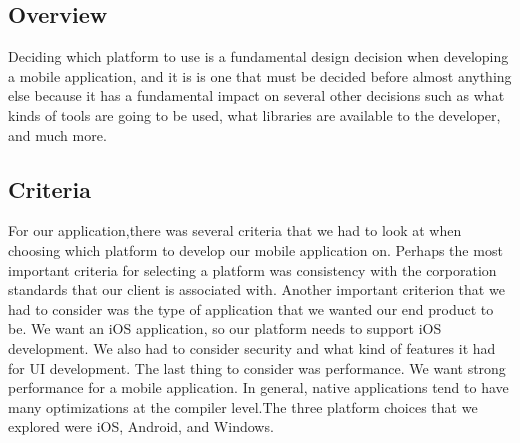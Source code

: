 \documentclass[onecolumn, draftclsnofoot,10pt, compsoc]{IEEEtran}
\begin{document}
	\subsection{Overview}
      Deciding which platform to use is a fundamental design decision when developing a mobile application, and it is is one that must be decided before almost anything else because it has a fundamental impact on several other decisions such as what kinds of tools are going to be used, what libraries are available to the developer, and much more. 
      \subsection{Criteria}
       For our application,there was several criteria that we had to look at when choosing which platform to develop our mobile application on. Perhaps the most important criteria for selecting a platform was consistency with the corporation standards that our client is associated with. Another important criterion that we had to consider was the type of application that we wanted our end product to be. We want an iOS application, so our platform needs to support iOS development. We also had to consider security and what kind of features it had for UI development. The last thing to consider was performance. We want strong performance for a mobile application. In general, native applications tend to have many optimizations at the compiler level.The three platform choices that we explored were iOS, Android, and Windows.
\end{document}
